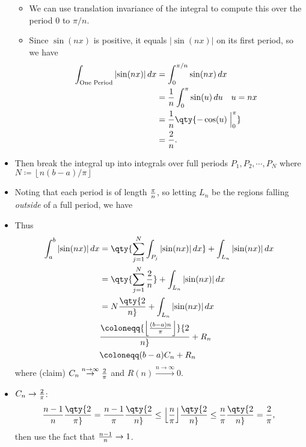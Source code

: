 \begin{solution}
\begin{itemize}
  \begin{itemize}
  \tightlist
  \item
    We can use translation invariance of the integral to compute this
    over the period \(0\) to \(\pi/n\).
  \item
    Since \(\sin(nx)\) is positive, it equals
    \({\left\lvert {\sin(nx)} \right\rvert}\) on its first period, so we
    have
    \begin{align*}
    \int_{\text{One Period}} {\left\lvert {\sin(nx)} \right\rvert} \, dx 
    &= \int_0^{\pi/n} \sin(nx)\,dx \\
    &= {1\over n} \int_0^\pi \sin(u) \,du \quad u = nx \\
    &= {1\over n} \qty{-\cos(u)\mathrel{\Big|}_0^\pi} \\
    &= {2 \over n}
    .\end{align*}
  \end{itemize}
\item
  Then break the integral up into integrals over full periods
  \(P_1, P_2, \cdots, P_N\) where
  \(N \coloneqq{\left\lfloor n(b-a)/\pi \right\rfloor}\)
\item
  Noting that each period is of length \(\pi\over n\), so letting
  \(L_n\) be the regions falling \emph{outside} of a full period, we
  have
\item
  Thus
  \begin{align*}
  \int_a^b {\left\lvert {\sin(nx)} \right\rvert} \, dx 
  &= \qty{ \sum_{j=1}^{N} \int_{P_j} {\left\lvert {\sin(nx)} \right\rvert} \, dx } +  \int_{L_n} {\left\lvert {\sin(nx)} \right\rvert}\,dx \\
  &= \qty{ \sum_{j=1}^{N} {2\over n} } +  \int_{L_n} {\left\lvert {\sin(nx)} \right\rvert}\,dx \\
  &= N \qty{2\over n} +  \int_{L_n} {\left\lvert {\sin(nx)} \right\rvert}\,dx \\
  &\coloneqq{\left\lfloor (b-a) n \over \pi \right\rfloor} {2\over n} +  R_n \\
  &\coloneqq(b-a)C_n + R_n 
  \end{align*}
  where (claim) \(C_n \overset{n\to\infty}\to {2\over \pi}\) and
  \(R(n) \overset{n\to\infty}\to 0\).
\item
  \(C_n \to {2\over \pi}\):
  \begin{align*}  
  {n-1 \over n} \qty{2\over \pi} = {n-1 \over \pi} \qty{2\over n} \leq {\left\lfloor n\over \pi \right\rfloor}\qty{2\over n} \leq {n \over \pi}\qty{2\over n} = {2 \over \pi}
  ,\end{align*}
  then use the fact that \({n-1 \over n} \to 1\).


\end{itemize}
\end{solution}
